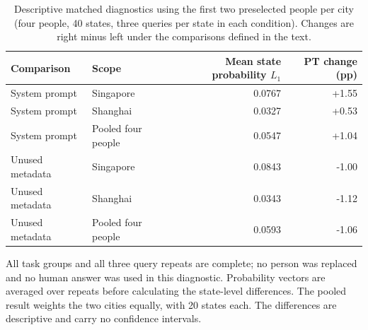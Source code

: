 \begin{table}[pos=htbp]
\centering\footnotesize
\caption{Descriptive matched diagnostics using the first two preselected people per city (four people, 40 states, three queries per state in each condition). Changes are right minus left under the comparisons defined in the text.}
\label{tab:teacher_prompt_pilot}
\setlength{\tabcolsep}{3pt}
\renewcommand{\arraystretch}{1.15}
\begin{tabular*}{\linewidth}{@{\extracolsep{\fill}}llrr@{}}
\toprule
Comparison & Scope & Mean state probability $L_1$ & PT change (pp) \\
\midrule
System prompt & Singapore & 0.0767 & +1.55 \\
System prompt & Shanghai & 0.0327 & +0.53 \\
System prompt & Pooled four people & 0.0547 & +1.04 \\
\midrule
Unused metadata & Singapore & 0.0843 & -1.00 \\
Unused metadata & Shanghai & 0.0343 & -1.12 \\
Unused metadata & Pooled four people & 0.0593 & -1.06 \\
\bottomrule
\end{tabular*}
\par\smallskip\begin{minipage}{\linewidth}\footnotesize
All task groups and all three query repeats are complete; no person was replaced and no human answer was used in this diagnostic. Probability vectors are averaged over repeats before calculating the state-level differences. The pooled result weights the two cities equally, with 20 states each. The differences are descriptive and carry no confidence intervals.
\end{minipage}
\end{table}
